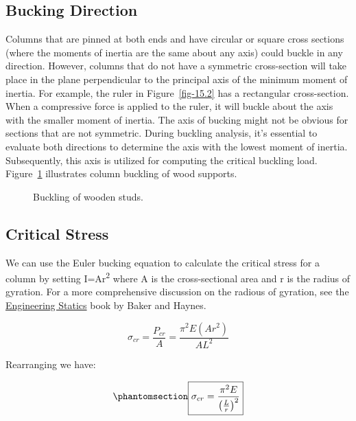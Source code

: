 \documentclass[
  letterpaper,
  DIV=11,
  numbers=noendperiod]{scrreprt}
\theoremstyle{definition}
\theoremstyle{remark}
\begin{document}
\subsection{Bucking Direction}\label{bucking-direction}

Columns that are pinned at both ends and have circular or square cross
sections (where the moments of inertia are the same about any axis)
could buckle in any direction. However, columns that do not have a
symmetric cross-section will take place in the plane perpendicular to
the principal axis of the minimum moment of inertia. For example, the
ruler in Figure~\ref{fig-15.2} has a rectangular cross-section. When a
compressive force is applied to the ruler, it will buckle about the axis
with the smaller moment of inertia. The axis of bucking might not be
obvious for sections that are not symmetric. During buckling analysis,
it's essential to evaluate both directions to determine the axis with
the lowest moment of inertia. Subsequently, this axis is utilized for
computing the critical buckling load. Figure~\ref{fig-15.6} illustrates
column buckling of wood supports.

\begin{figure}


\caption{\label{fig-15.6}Buckling of wooden studs.}

\end{figure}%

\subsection{Critical Stress}\label{critical-stress}

We can use the Euler bucking equation to calculate the critical stress
for a column by setting I=Ar\textsuperscript{2} where A is the
cross-sectional area and r is the radius of gyration. For a more
comprehensive discussion on the radious of gyration, see the
\href{https://engineeringstatics.org/radius-of-gyration-sec.html}{Engineering
Statics} book by Baker and Haynes.

\[
\sigma_{c r}=\frac{P_{c r}}{A}=\frac{\pi^2 E\left(A r^2\right)}{A L^2}
\]

Rearranging we have:

\begin{equation}\phantomsection\label{eq-15.2}{
\boxed{\sigma_{c r}=\frac{\pi^2 E}{\left(\frac{L}{r}\right)^2}}
}\end{equation}
\end{document}
